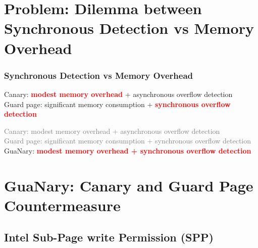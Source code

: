 \documentclass[xcolor=table,bigger,unknownkeysallowed]{beamer}
\newcommand{\myemph}[1]{\textcolor{red}{\bf #1}}
\begin{document}
\section{Problem: Dilemma between Synchronous Detection vs Memory Overhead}
\begin{frame}
	\frametitle{Synchronous Detection vs Memory Overhead} 
	\begin{overprint}
		Canary: \myemph{modest memory overhead} + asynchronous overflow detection\\
		Guard page: significant memory consumption + \myemph{synchronous overflow detection}
		\begin{figure}
			\centering
		\end{figure}

		\textcolor{gray}{Canary: modest memory overhead + asynchronous overflow detection}\\
		\textcolor{gray}{Guard page: significant memory consumption + synchronous overflow detection}\\
		GuaNary: \myemph{modest memory overhead + synchronous overflow detection}
		\begin{figure}
			\centering
		\end{figure}
	\end{overprint}
	
\end{frame}
\section{GuaNary: Canary and Guard Page Countermeasure}
\subsection{Intel Sub-Page write Permission (SPP)}
\end{document}
